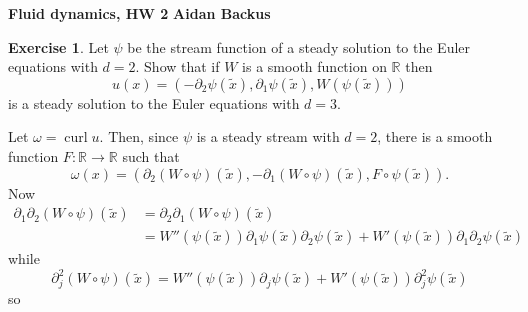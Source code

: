 \documentclass[10pt]{article}
\newcommand{\RR}{\mathbb{R}}
\DeclareMathOperator{\curl}{curl}
\theoremstyle{definition}
\newtheorem{exer}{Exercise}
\begin{document}
\noindent
\large\textbf{Fluid dynamics, HW 2} \hfill \textbf{Aidan Backus} \\

\begin{exer}
Let $\psi$ be the stream function of a steady solution to the Euler equations with $d = 2$.
Show that if $W$ is a smooth function on $\RR$ then
$$u(x) = (-\partial_2 \psi(\tilde x), \partial_1 \psi(\tilde x), W(\psi(\tilde x)))$$
is a steady solution to the Euler equations with $d = 3$.
\end{exer}

Let $\omega = \curl u$. Then, since $\psi$ is a steady stream with $d = 2$, there is a smooth function $F: \RR \to \RR$ such that
$$
\omega(x) = (\partial_2(W \circ \psi)(\tilde x), -\partial_1(W \circ \psi)(\tilde x), F \circ \psi(\tilde x)).$$
Now
\begin{align*}\partial_1\partial_2(W \circ \psi)(\tilde x) &= \partial_2\partial_1(W \circ \psi)(\tilde x)\\
&= W''(\psi(\tilde x)) \partial_1 \psi(\tilde x) \partial_2\psi(\tilde x) + W'(\psi(\tilde x)) \partial_1\partial_2 \psi(\tilde x)
\end{align*}
while
$$\partial_j^2(W \circ \psi)(\tilde x) = W''(\psi(\tilde x))\partial_j\psi(\tilde x) + W'(\psi(\tilde x))\partial_j^2\psi(\tilde x)$$
so
\end{document}
